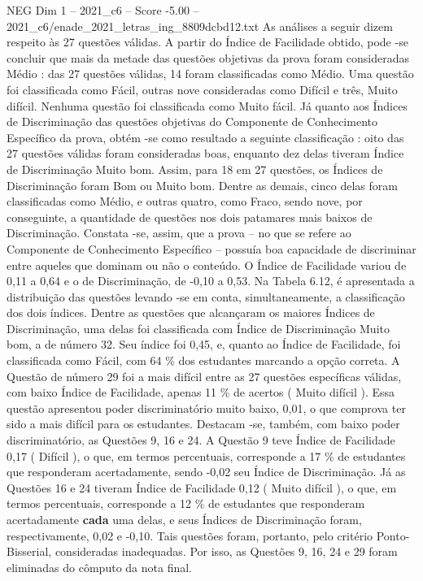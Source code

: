 \begin{textsample}{NEG Dim 1 – 2021\_c6 – Score -5.00 – 2021\_c6/enade\_2021\_letras\_ing\_8809dcbd12.txt}
As análises a seguir dizem respeito às 27 questões válidas.
A partir do Índice de Facilidade obtido, pode -se concluir que mais da metade das questões objetivas da prova foram consideradas Médio : das 27 questões válidas, 14 foram classificadas como Médio.
Uma questão foi classificada como Fácil, outras nove consideradas como Difícil e três, Muito difícil.
Nenhuma questão foi classificada como Muito fácil.
Já quanto aos Índices de Discriminação das questões objetivas do Componente de Conhecimento Específico da prova, obtém -se como resultado a seguinte classificação : oito das 27 questões válidas foram consideradas boas, enquanto dez delas tiveram Índice de Discriminação Muito bom.
Assim, para 18 em 27 questões, os Índices de Discriminação foram Bom ou Muito bom.
Dentre as demais, cinco delas foram classificadas como Médio, e outras quatro, como Fraco, sendo nove, por conseguinte, a quantidade de questões nos dois patamares mais baixos de Discriminação.
Constata -se, assim, que a prova – no que se refere ao Componente de Conhecimento Específico – possuía boa capacidade de discriminar entre aqueles que dominam ou não o conteúdo.
O Índice de Facilidade variou de 0,11 a 0,64 e o de Discriminação, de -0,10 a 0,53.
Na Tabela 6.12, é apresentada a distribuição das questões levando -se em conta, simultaneamente, a classificação dos dois índices.
Dentre as questões que alcançaram os maiores Índices de Discriminação, uma delas foi classificada com Índice de Discriminação Muito bom, a de número 32.
Seu índice foi 0,45, e, quanto ao Índice de Facilidade, foi classificada como Fácil, com 64 \% dos estudantes marcando a opção correta.
A Questão de número 29 foi a mais difícil entre as 27 questões específicas válidas, com baixo Índice de Facilidade, apenas 11 \% de acertos ( Muito difícil ).
Essa questão apresentou poder discriminatório muito baixo, 0,01, o que comprova ter sido a mais difícil para os estudantes.
Destacam -se, também, com baixo poder discriminatório, as Questões 9, 16 e 24.
A Questão 9 teve Índice de Facilidade 0,17 ( Difícil ), o que, em termos percentuais, corresponde a 17 \% de estudantes que responderam acertadamente, sendo -0,02 seu Índice de Discriminação.
Já as Questões 16 e 24 tiveram Índice de Facilidade 0,12 ( Muito difícil ), o que, em termos percentuais, corresponde a 12 \% de estudantes que responderam acertadamente \textbf{cada} uma delas, e seus Índices de Discriminação foram, respectivamente, 0,02 e -0,10.
Tais questões foram, portanto, pelo critério Ponto-Bisserial, consideradas inadequadas.
Por isso, as Questões 9, 16, 24 e 29 foram eliminadas do cômputo da nota final.

\end{textsample}

